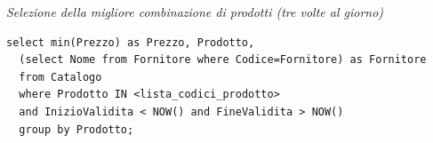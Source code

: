 \noindent\textit{Selezione della migliore combinazione di prodotti (tre volte al giorno)}
\begin{verbatim}
select min(Prezzo) as Prezzo, Prodotto,
  (select Nome from Fornitore where Codice=Fornitore) as Fornitore
  from Catalogo
  where Prodotto IN <lista_codici_prodotto>
  and InizioValidita < NOW() and FineValidita > NOW()
  group by Prodotto;
\end{verbatim}
\vspace{0.5cm}

\noindent{}
\newline\newline
